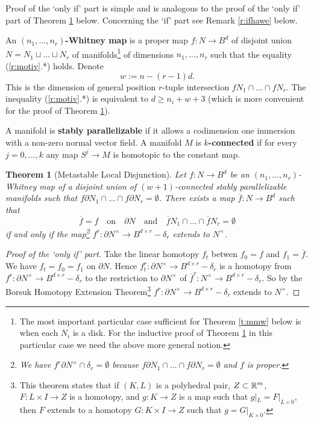 \documentclass[12pt]{article}
\def\diag{\delta}
\theoremstyle{plain}
\newtheorem{Theorem}{Theorem}[section]
\theoremstyle{definition}
\begin{document}
Proof of the `only if' part is simple and is analogous to the proof of the `only if' part of Theorem \ref{l:ldm} below.
Concerning the `if' part  see Remark \ref{r:ifhawe} below.

An {\bf $(n_1,\ldots,n_r)$-Whitney map} is a proper map $f:N\to B^d$ of disjoint union
$N=N_1\sqcup\ldots\sqcup N_r$ of manifolds\footnote{The most important particular case sufficient for Theorem \ref{t:mmw} below is when each $N_i$ is a disk.
For the inductive proof of Theorem \ref{l:ldm} in this particular case we need the above more general notion.}
of dimensions $n_1,\ldots,n_r$ such that the equality (\ref{r:motiv}.*) holds.
Denote
$$w:=n-(r-1)d.$$
This is the dimension of general position $r$-tuple intersection $fN_1\cap\ldots\cap fN_r$.
The inequality (\ref{r:motiv}.*) is equivalent to $d\ge n_i+w+3$ (which is more convenient for the proof of Theorem \ref{l:ldm}).

A manifold is {\bf stably parallelizable} if it allows a codimension one immersion with a non-zero normal vector field.
A manifold $M$ is {\bf $k$-connected} if for every $j=0,\ldots,k$ any map $S^j\to M$ is homotopic to the constant map.

\begin{Theorem}[Metastable Local Disjunction]\label{l:ldm}
Let $f:N\to B^d$ be an $(n_1,\ldots,n_r)$-Whitney map of a disjoint union of $(w+1)$-connected stably  parallelizable manifolds such that $f\partial N_1\cap\ldots\cap f\partial N_r=\emptyset$.
There exists a map $\overline f:N\to B^d$ such that
$$\overline f=f \quad\text{on}\quad \partial N \quad\text{and}\quad
\overline fN_1\cap\ldots\cap \overline fN_r=\emptyset$$
if and only if the map\footnote{We have $f^r\partial N^\times\cap \diag_r=\emptyset$ because $f\partial N_1\cap\ldots\cap f\partial N_r=\emptyset$ and $f$ is proper.}
$f^r:\partial N^\times\to B^{d\times r}-\diag_r$ extends to $N^\times$.
\end{Theorem}

\begin{proof}[Proof of the `only if' part]
Take the linear homotopy $f_t$ betwen $f_0=f$ and $f_1=\overline f$.
We have $f_t=f_0=f_1$ on $\partial N$.
Hence $f_t^r:\partial N^\times\to B^{d\times r}-\diag_r$ is a homotopy from
$f^r:\partial N^\times\to B^{d\times r}-\diag_r$
to the restriction to $\partial N^\times$ of $\overline f^r:N^\times\to B^{d\times r}-\diag_r$.
So by the Borsuk Homotopy Extension Theorem\footnote{\label{f:bhet}This theorem states that if $(K,L)$ is a polyhedral pair, $Z\subset{\mathbb R}^m$, \ $F:L\times I\to Z$ is a homotopy, and $g:K\to Z$ is a map such that $g|_L=F|_{L\times0}$, then $F$ extends to a homotopy $G:K\times I\to Z$ such that $g=G|_{K\times0}$.}
 $f^r:\partial N^\times\to B^{d\times r}-\diag_r$ extends to $N^\times$.
\end{proof}
\end{document}
